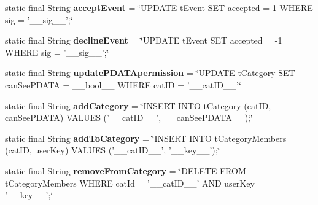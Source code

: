 \begin{DoxyCompactItemize}
\item 
\hypertarget{classballmerpeak_1_1turtlenet_1_1server_1_1DBStrings_acf9b2fff82aaa6ad4d024ff69d1cba96}{static final String {\bfseries accept\-Event} = \char`\"{}U\-P\-D\-A\-T\-E t\-Event S\-E\-T accepted = 1 W\-H\-E\-R\-E sig = '\-\_\-\-\_\-sig\-\_\-\-\_\-';\char`\"{}}\label{classballmerpeak_1_1turtlenet_1_1server_1_1DBStrings_acf9b2fff82aaa6ad4d024ff69d1cba96}

\item 
\hypertarget{classballmerpeak_1_1turtlenet_1_1server_1_1DBStrings_a17aab2fc0a6a4f06d268a67e4e7104d4}{static final String {\bfseries decline\-Event} = \char`\"{}U\-P\-D\-A\-T\-E t\-Event S\-E\-T accepted = -\/1 W\-H\-E\-R\-E sig = '\-\_\-\-\_\-sig\-\_\-\-\_\-';\char`\"{}}\label{classballmerpeak_1_1turtlenet_1_1server_1_1DBStrings_a17aab2fc0a6a4f06d268a67e4e7104d4}

\item 
\hypertarget{classballmerpeak_1_1turtlenet_1_1server_1_1DBStrings_a1464c2aac4cc5e8112ece2e1840e1976}{static final String {\bfseries update\-P\-D\-A\-T\-Apermission} = \char`\"{}U\-P\-D\-A\-T\-E t\-Category S\-E\-T can\-See\-P\-D\-A\-T\-A = \-\_\-\-\_\-bool\-\_\-\-\_\- W\-H\-E\-R\-E cat\-I\-D = '\-\_\-\-\_\-cat\-I\-D\-\_\-\-\_\-'\char`\"{}}\label{classballmerpeak_1_1turtlenet_1_1server_1_1DBStrings_a1464c2aac4cc5e8112ece2e1840e1976}

\item 
\hypertarget{classballmerpeak_1_1turtlenet_1_1server_1_1DBStrings_a4de95aa5509b7246d85f48577ea3822e}{static final String {\bfseries add\-Category} = \char`\"{}I\-N\-S\-E\-R\-T I\-N\-T\-O t\-Category (cat\-I\-D, can\-See\-P\-D\-A\-T\-A) V\-A\-L\-U\-E\-S ('\-\_\-\-\_\-cat\-I\-D\-\_\-\-\_\-', \-\_\-\-\_\-can\-See\-P\-D\-A\-T\-A\-\_\-\-\_\-);\char`\"{}}\label{classballmerpeak_1_1turtlenet_1_1server_1_1DBStrings_a4de95aa5509b7246d85f48577ea3822e}

\item 
\hypertarget{classballmerpeak_1_1turtlenet_1_1server_1_1DBStrings_ae9cfc6daa2238b984d82b11442b47a49}{static final String {\bfseries add\-To\-Category} = \char`\"{}I\-N\-S\-E\-R\-T I\-N\-T\-O t\-Category\-Members (cat\-I\-D, user\-Key) V\-A\-L\-U\-E\-S ('\-\_\-\-\_\-cat\-I\-D\-\_\-\-\_\-', '\-\_\-\-\_\-key\-\_\-\-\_\-');\char`\"{}}\label{classballmerpeak_1_1turtlenet_1_1server_1_1DBStrings_ae9cfc6daa2238b984d82b11442b47a49}

\item 
\hypertarget{classballmerpeak_1_1turtlenet_1_1server_1_1DBStrings_a46667f523f0f1dad5378e5b23b49a18e}{static final String {\bfseries remove\-From\-Category} = \char`\"{}D\-E\-L\-E\-T\-E F\-R\-O\-M t\-Category\-Members W\-H\-E\-R\-E cat\-Id = '\-\_\-\-\_\-cat\-I\-D\-\_\-\-\_\-' A\-N\-D user\-Key = '\-\_\-\-\_\-key\-\_\-\-\_\-';\char`\"{}}\label{classballmerpeak_1_1turtlenet_1_1server_1_1DBStrings_a46667f523f0f1dad5378e5b23b49a18e}


\end{DoxyCompactItemize}
